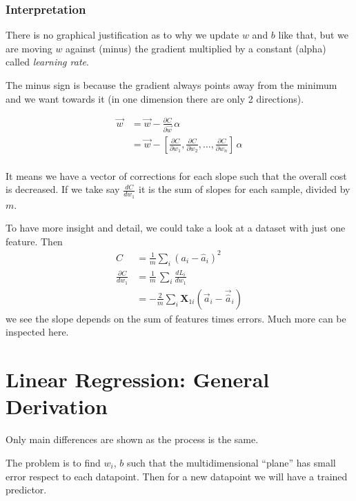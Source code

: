 \subsubsection{Interpretation}

There is no graphical justification as to why we update $w$ and $b$ like that, but we are moving $w$ against (minus) the gradient multiplied by a constant (alpha) called \textit{learning rate}.

The minus sign is because the gradient always points away from the minimum and we want towards it (in one dimension there are only 2 directions). 

\begin{align}
  \vec{w} &= \vec{w} -\frac{\partial C}{\partial \vec{w}}\,\alpha\\
  &= \vec{w} -[\frac{\partial C}{\partial w_1}, \frac{\partial C}{\partial w_2},\ldots, \frac{\partial C}{\partial w_n}]\,\alpha\\
\end{align}

It means we have a vector of corrections for each slope such that the overall cost is decreased. If we take say $\frac{dC}{dw_1}$ it is the sum of slopes for each sample, divided by $m$. 

To have more insight and detail, we could take a look at a dataset with just one feature. Then 
\begin{align*}
  C &= \frac{1}{m}\sum_i(a_i - \hat{a}_i)^2 \\ 
  \frac{\partial C}{dw_1}&= \frac{1}{m}\,\sum_i \frac{dL_i}{dw_1} \\
  &= -\frac{2}{m}\sum_i \mathbf{X}_{1i}(\vec{a}_i-\vec{\hat{a}}_i)
\end{align*}
we see the slope depends on the sum of features times errors. Much more can be inspected here.


\section{Linear Regression: General Derivation}
Only main differences are shown as the process is the same.

The problem is to find $w_i$, $b$ such that the multidimensional ``plane'' has small error respect to each datapoint. Then for a new datapoint we will have a trained predictor.

